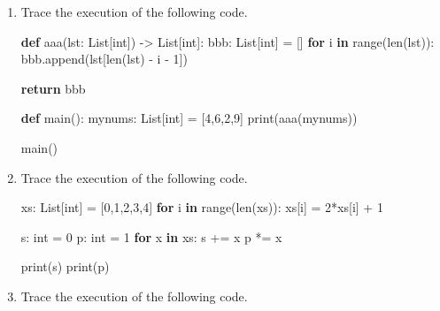 \documentclass[]{article}
\newenvironment{Shaded}{}{}
\newcommand{\KeywordTok}[1]{\textcolor[rgb]{0.00,0.44,0.13}{\textbf{#1}}}
\newcommand{\DecValTok}[1]{\textcolor[rgb]{0.25,0.63,0.44}{#1}}
\newcommand{\ControlFlowTok}[1]{\textcolor[rgb]{0.00,0.44,0.13}{\textbf{#1}}}
\newcommand{\OperatorTok}[1]{\textcolor[rgb]{0.40,0.40,0.40}{#1}}
\newcommand{\BuiltInTok}[1]{#1}
\newcommand{\NormalTok}[1]{#1}
\begin{document}
\begin{enumerate}
\def\labelenumi{\arabic{enumi}.}
\item
  Trace the execution of the following code.

\begin{Shaded}
\begin{Highlighting}[]
\KeywordTok{def}\NormalTok{ aaa(lst: List[}\BuiltInTok{int}\NormalTok{]) }\OperatorTok{->}\NormalTok{ List[}\BuiltInTok{int}\NormalTok{]:}
\NormalTok{    bbb: List[}\BuiltInTok{int}\NormalTok{] }\OperatorTok{=}\NormalTok{ []}
    \ControlFlowTok{for}\NormalTok{ i }\KeywordTok{in} \BuiltInTok{range}\NormalTok{(}\BuiltInTok{len}\NormalTok{(lst)):}
\NormalTok{        bbb.append(lst[}\BuiltInTok{len}\NormalTok{(lst) }\OperatorTok{-}\NormalTok{ i }\OperatorTok{-} \DecValTok{1}\NormalTok{])}

    \ControlFlowTok{return}\NormalTok{ bbb}

\KeywordTok{def}\NormalTok{ main():}
\NormalTok{    mynums: List[}\BuiltInTok{int}\NormalTok{] }\OperatorTok{=}\NormalTok{ [}\DecValTok{4}\NormalTok{,}\DecValTok{6}\NormalTok{,}\DecValTok{2}\NormalTok{,}\DecValTok{9}\NormalTok{]}
    \BuiltInTok{print}\NormalTok{(aaa(mynums))}

\NormalTok{main()}
\end{Highlighting}
\end{Shaded}
\item
  Trace the execution of the following code.

\begin{Shaded}
\begin{Highlighting}[]
\NormalTok{xs: List[}\BuiltInTok{int}\NormalTok{] }\OperatorTok{=}\NormalTok{ [}\DecValTok{0}\NormalTok{,}\DecValTok{1}\NormalTok{,}\DecValTok{2}\NormalTok{,}\DecValTok{3}\NormalTok{,}\DecValTok{4}\NormalTok{]}
\ControlFlowTok{for}\NormalTok{ i }\KeywordTok{in} \BuiltInTok{range}\NormalTok{(}\BuiltInTok{len}\NormalTok{(xs)):}
\NormalTok{    xs[i] }\OperatorTok{=} \DecValTok{2}\OperatorTok{*}\NormalTok{xs[i] }\OperatorTok{+} \DecValTok{1}

\NormalTok{s: }\BuiltInTok{int} \OperatorTok{=} \DecValTok{0}
\NormalTok{p: }\BuiltInTok{int} \OperatorTok{=} \DecValTok{1}
\ControlFlowTok{for}\NormalTok{ x }\KeywordTok{in}\NormalTok{ xs:}
\NormalTok{    s }\OperatorTok{+=}\NormalTok{ x}
\NormalTok{    p }\OperatorTok{*=}\NormalTok{ x}

\BuiltInTok{print}\NormalTok{(s)}
\BuiltInTok{print}\NormalTok{(p)}
\end{Highlighting}
\end{Shaded}
\item
  Trace the execution of the following code.


\end{enumerate}
\end{document}
